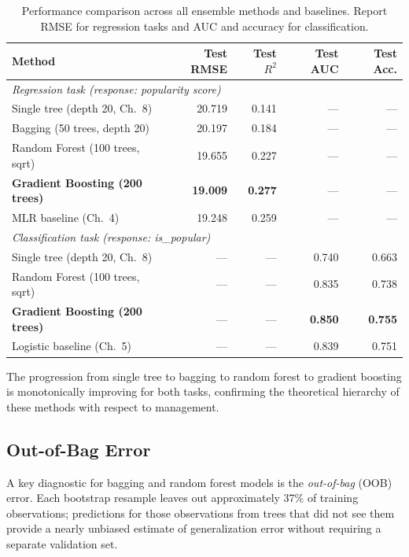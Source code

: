 \documentclass[12pt, oneside]{book}
\begin{document}
\begin{table}[H]
\centering
\caption{Performance comparison across all ensemble methods and baselines. Report RMSE for regression tasks and AUC and accuracy for classification.}
\label{tab:ch9_comparison}
\begin{tabular}{lrrrr}
\toprule
\textbf{Method} & \textbf{Test RMSE} & \textbf{Test $R^2$} & \textbf{Test AUC} & \textbf{Test Acc.} \\
\midrule
\multicolumn{5}{l}{\textit{Regression task (response: popularity score)}} \\
Single tree (depth 20, Ch.\ 8)       & 20.719 & 0.141 & ---   & ---   \\
Bagging (50 trees, depth 20)         & 20.197 & 0.184 & ---   & ---   \\
Random Forest (100 trees, sqrt)      & 19.655 & 0.227 & ---   & ---   \\
\textbf{Gradient Boosting (200 trees)} & \textbf{19.009} & \textbf{0.277} & --- & --- \\
MLR baseline (Ch.\ 4)                & 19.248 & 0.259 & ---   & ---   \\
\midrule
\multicolumn{5}{l}{\textit{Classification task (response: is\_popular)}} \\
Single tree (depth 20, Ch.\ 8)       & ---   & ---   & 0.740 & 0.663 \\
Random Forest (100 trees, sqrt)      & ---   & ---   & 0.835 & 0.738 \\
\textbf{Gradient Boosting (200 trees)} & ---   & ---   & \textbf{0.850} & \textbf{0.755} \\
Logistic baseline (Ch.\ 5)           & ---   & ---   & 0.839 & 0.751 \\
\bottomrule
\end{tabular}
\end{table}
 
The progression from single tree to bagging to random forest to gradient boosting is monotonically improving for both tasks, confirming the theoretical hierarchy of these methods with respect to management.
 
\subsection{Out-of-Bag Error}
 
A key diagnostic for bagging and random forest models is the \textit{out-of-bag} (OOB) error. Each bootstrap resample leaves out approximately 37\% of training observations; predictions for those observations from trees that did not see them provide a nearly unbiased estimate of generalization error without requiring a separate validation set.
 
\end{document}
